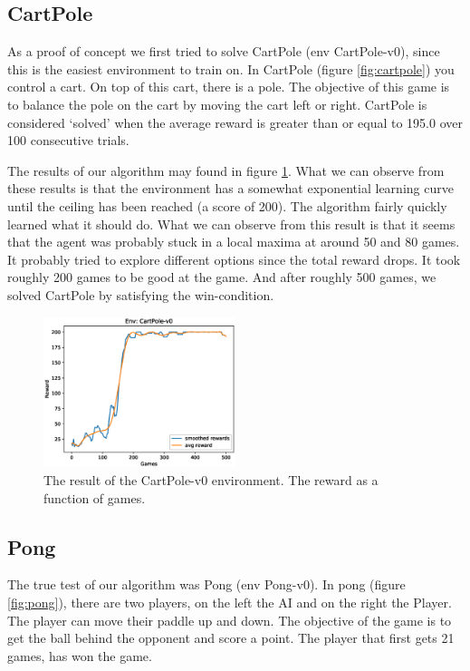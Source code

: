 \documentclass{article}
\begin{document}
\subsection{CartPole}
As a proof of concept we first tried to solve CartPole (env CartPole-v0), since this is the easiest environment to train on. In CartPole (figure \ref{fig:cartpole}) you control a cart. On top of this cart, there is a pole. The objective of this game is to balance the pole on the cart by moving the cart left or right. CartPole is considered `solved' when the average reward is greater than or equal to 195.0 over 100 consecutive trials.

The results of our algorithm may found in figure \ref{fig:cartpole_results}. What we can observe from these results is that the environment has a somewhat exponential learning curve until the ceiling has been reached (a score of 200). The algorithm fairly quickly learned what it should do. What we can observe from this result is that it seems that the agent was probably stuck in a local maxima at around 50 and 80 games. It probably tried to explore different options since the total reward drops. It took roughly 200 games to be good at the game. And after roughly 500 games, we solved CartPole by satisfying the win-condition.

\begin{figure}[H]
\centering
\includegraphics[width=0.5\textwidth]{images/cartpole_results.eps}
\caption{The result of the CartPole-v0 environment. The reward as a function of games.}
\label{fig:cartpole_results}
\end{figure}

\subsection{Pong}
The true test of our algorithm was Pong (env Pong-v0). In pong (figure \ref{fig:pong}), there are two players, on the left the AI and on the right the Player. The player can move their paddle up and down. The objective of the game is to get the ball behind the opponent and score a point. The player that first gets 21 games, has won the game.
\end{document}
